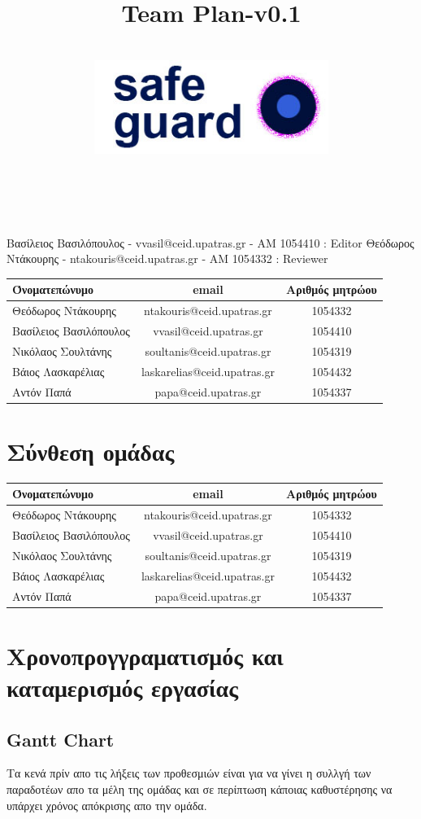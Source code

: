 \documentclass{article}
\title{Team Plan-v0.1}
\author{\\
\includegraphics[width=3in]{safeguard}\\[1ex]\\\\
}
\begin{document}
\maketitle

\newpage

Βασίλειος Βασιλόπουλος - vvasil@ceid.upatras.gr - ΑΜ 1054410 : Editor
Θεόδωρος Ντάκουρης - ntakouris@ceid.upatras.gr - ΑΜ 1054332 : Reviewer

\begin{tabular}{|l|c|c|}
\hline
Όνοματεπώνυμο & email & Αριθμός μητρώου  \\
\hline
Θεόδωρος Ντάκουρης & ntakouris@ceid.upatras.gr & 1054332 \\
Βασίλειος Βασιλόπουλος & vvasil@ceid.upatras.gr &  1054410\\
Νικόλαος Σουλτάνης & soultanis@ceid.upatras.gr & 1054319  \\
Βάιος Λασκαρέλιας & laskarelias@ceid.upatras.gr & 1054432 \\
Αντόν Παπά & papa@ceid.upatras.gr & 1054337 \\
\hline
\end{tabular}



\renewcommand{\contentsname}{Περιεχόμενα}
\tableofcontents


\section{Σύνθεση ομάδας}
\begin{tabular}{|l|c|c|}
\hline
Όνοματεπώνυμο & email & Αριθμός μητρώου  \\
\hline
Θεόδωρος Ντάκουρης & ntakouris@ceid.upatras.gr & 1054332 \\
Βασίλειος Βασιλόπουλος & vvasil@ceid.upatras.gr &  1054410\\
Νικόλαος Σουλτάνης & soultanis@ceid.upatras.gr & 1054319  \\
Βάιος Λασκαρέλιας & laskarelias@ceid.upatras.gr & 1054432 \\
Αντόν Παπά & papa@ceid.upatras.gr & 1054337 \\
\hline
\end{tabular}

\section{Χρονοπρογγραματισμός και καταμερισμός εργασίας}
\subsection{Gantt Chart} %
Τα κενά πρίν απο τις λήξεις των προθεσμιών είναι για να γίνει η συλλγή των παραδοτέων απο τα μέλη της ομάδας και σε περίπτωση κάποιας καθυστέρησης να υπάρχει χρόνος απόκρισης απο την ομάδα.
\begin{center}
\end{center}
\end{document}
